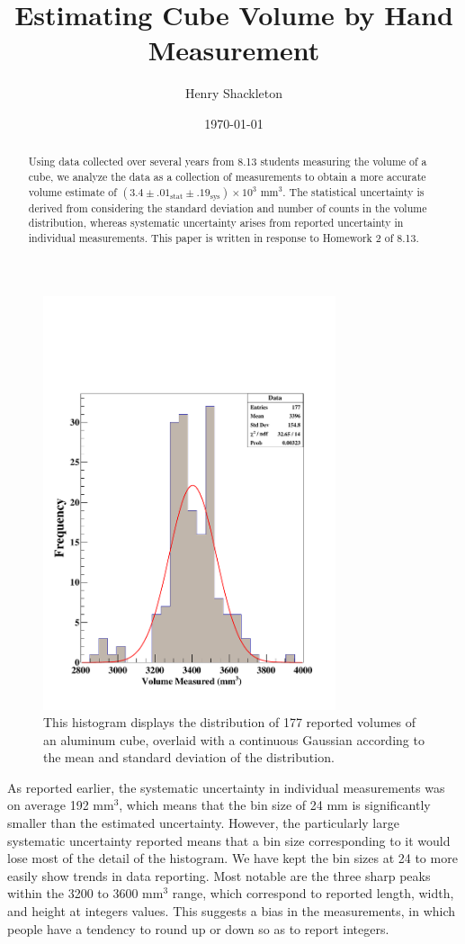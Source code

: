 \documentclass[aps, twocolumn, secnumarabic, amsmath, amssymb, nofootinbib, floatfix]{revtex4-1}
\begin{document}
\title{Estimating Cube Volume by Hand Measurement}
\author{Henry Shackleton}
\date{\today}

\begin{abstract}
  Using data collected over several years from 8.13 students measuring the volume of a cube, we analyze the data as a collection of measurements to obtain a more accurate volume estimate of $(3.4 \pm .01_\text{stat} \pm .19_\text{sys}) \times 10^3$ mm$^3$. The statistical uncertainty is derived from considering the standard deviation and number of counts in the volume distribution, whereas systematic uncertainty arises from reported uncertainty in individual measurements. This paper is written in response to Homework 2 of 8.13.
\end{abstract}

\maketitle
\begin{figure}
\includegraphics[width=8.6cm]{c1.pdf}
\caption{This histogram displays the distribution of 177 reported volumes of an aluminum cube, overlaid with a continuous Gaussian according to the mean and standard deviation of the distribution.}
  \end{figure}
As reported earlier, the systematic uncertainty in individual measurements was on average 192 mm$^3$, which means that the bin size of 24 mm is significantly smaller than the estimated uncertainty. However, the particularly large systematic uncertainty reported means that a bin size corresponding to it would lose most of the detail of the histogram. We have kept the bin sizes at 24 to more easily show trends in data reporting. Most notable are the three sharp peaks within the 3200 to 3600 mm$^3$ range, which correspond to reported length, width, and height at integers values. This suggests a bias in the measurements, in which people have a tendency to round up or down so as to report integers.
\end{document}
